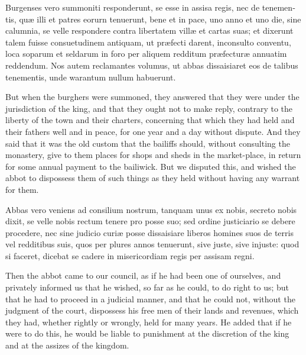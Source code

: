 \documentclass{book}
\begin{document}
\begin{paracol}{2}
\switchcolumn*

\begin{otherlanguage}{latin}
Burgenses vero summoniti responderunt, se esse in assisa regis, nec de tenementis, qu\ae{} illi et patres eorurn tenuerunt, bene et in pace, uno anno et uno die, sine calumnia, se velle respondere contra libertatem vill\ae{} et cartas suas; et dixerunt talem fuisse consuetudinem antiquam, ut pr\ae{}fecti darent, inconsulto conventu, loca soparum et seldarum in foro per aliquem redditum pr\ae{}fectur\ae{} annuatim reddendum. Nos autem reclamantes volumus, ut abbas dissaisiaret eos de talibus tenementis, unde warantum nullum habuerunt.
\end{otherlanguage}

\switchcolumn

But when the burghers were summoned, they answered that they were under the jurisdiction of the king, and that they ought not to make reply, contrary to the liberty of the town and their charters, concerning that which they had held and their fathers well and in peace, for one year and a day without dispute. And they said that it was the old custom that the bailiffs should, without consulting the monastery, give to them places for shops and sheds in the market-place, in return for some annual payment to the bailiwick. But we disputed this, and wished the abbot to dispossess them of such things as they held without having any warrant for them.

\switchcolumn*

\begin{otherlanguage}{latin}
Abbas vero veniens ad consilium nostrum, tanquam unus ex nobis, secreto nobis dixit, se velle nobis rectum tenere pro posse suo; sed ordine justiciario se debere procedere, nec sine judicio curi\ae{} posse dissaisiare liberos homines suos de terris vel redditibus suis, quos per plures annos tenuerunt, sive juste, sive injuste: quod si faceret, dicebat se cadere in misericordiam regis per assisam regni.
\end{otherlanguage}

\switchcolumn

Then the abbot came to our council, as if he had been one of ourselves, and privately informed us that he wished, so far as he could, to do right to us; but that he had to proceed in a judicial manner, and that he could not, without the judgment of the court, dispossess his free men of their lands and revenues, which they had, whether rightly or wrongly, held for many years. He added that if he were to do this, he would be liable to punishment at the discretion of the king and at the assizes of the kingdom.


\end{paracol}
\end{document}
